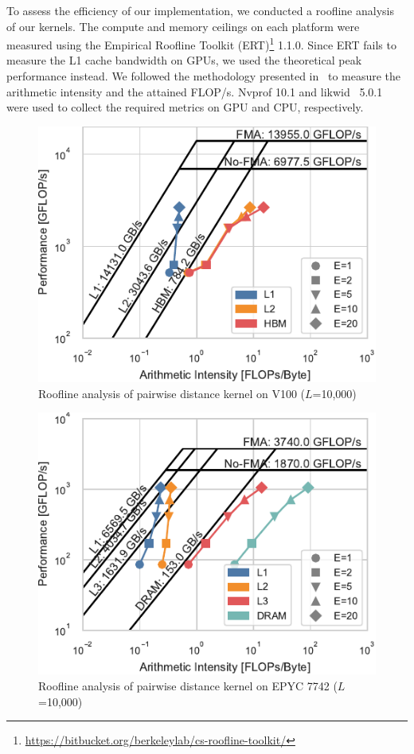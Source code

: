 \documentclass[conference]{IEEEtran}
\begin{document}
To assess the efficiency of our implementation, we conducted a roofline
analysis~\cite{Williams2008} of our kernels. The compute and memory ceilings
on each platform were measured using the Empirical Roofline Toolkit (ERT)\footnote{\url{https://bitbucket.org/berkeleylab/cs-roofline-toolkit/}} 1.1.0.
Since ERT fails to measure the L1 cache bandwidth on GPUs, we used the
theoretical peak performance instead. We followed the methodology presented
in~\cite{Yang2020a,Yang2020b} to measure the arithmetic intensity and the
attained FLOP/s. Nvprof 10.1 and likwid~\cite{Treibig2010} 5.0.1 were used to
collect the required metrics on GPU and CPU, respectively.


\begin{figure}
    \centering
    \includegraphics{figs/roofline_distances_v100}
    \caption{Roofline analysis of pairwise distance kernel on V100 ($L$=10,000)}%
    \label{fig:roofline-distances-v100}
\end{figure}

\begin{figure}
    \centering
    \includegraphics{figs/roofline_distances_epyc}
    \caption{Roofline analysis of pairwise distance kernel on EPYC 7742 ($L$=10,000)}%
    \label{fig:roofline-distances-epyc}
\end{figure}
\end{document}
